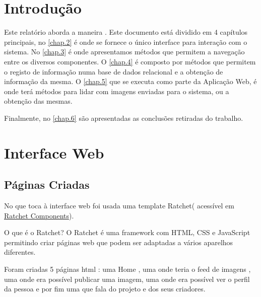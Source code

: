 \documentclass{report}
\begin{document}
\tableofcontents


\clearpage
{}

\chapter{Introdução}
\label{chap.introducao}

\par
Este relatório aborda a maneira . Este documento está dividido em 4 capítulos principais, no \autoref{chap.2} é onde se fornece o único interface para interação com o sistema. No \autoref{chap.3} é onde apresentamos métodos que permitem a navegação entre os diversos componentes. O \autoref{chap.4} é composto por métodos que permitem o registo de informação numa base de dados relacional e a obtenção de informação da mesma. O \autoref{chap.5} que se executa como parte da Aplicação Web, é onde terá métodos para lidar com imagens enviadas para o sistema, ou a obtenção das mesmas.  \par 
Finalmente, no \autoref{chap.6} são apresentadas as conclusões retiradas do trabalho.

\chapter{Interface Web}
\label{chap.2}

\section{Páginas Criadas}
\par 
No que toca à interface web foi usada uma template Ratchet( acessível em \href{http://goratchet.com/components/}{Ratchet Components}).\par
\par
O que é o Ratchet? O Ratchet é uma framework com HTML, CSS e JavaScript permitindo criar páginas web que podem ser adaptadas a vários aparelhos diferentes.
\par
Foram criadas 5 páginas html : uma Home , uma onde teria o feed de imagens , uma onde era possível publicar uma imagem, uma onde era possível ver o perfil da pessoa e por fim uma que fala do projeto e dos seus criadores.
\end{document}
